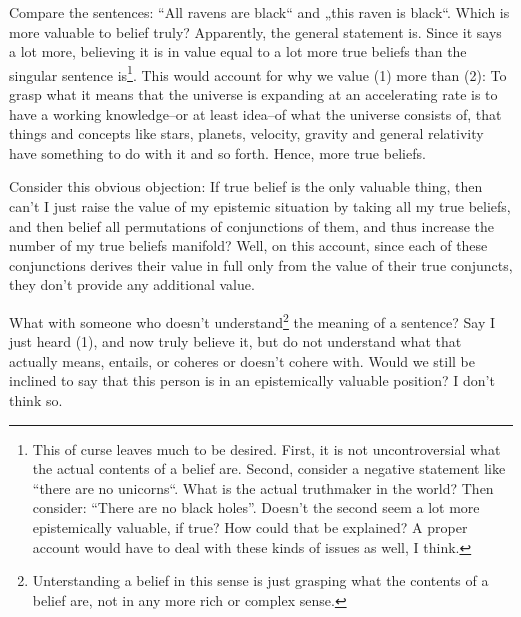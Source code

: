 \documentclass[12pt,numbers=noenddot]{scrartcl}
\begin{document}
Compare the sentences: “All ravens are black“ and „this raven is black“. Which is more valuable to belief truly? Apparently, the general statement is. Since it says a lot more, believing it is in value equal to a lot more true beliefs than the singular sentence is\footnote{\label{foot:noblackholes}This of curse leaves much to be desired. First, it is not uncontroversial what the actual contents of a belief are. Second, consider a negative statement like “there are no unicorns“. What is the actual truthmaker in the world? Then consider: “There are no black holes”. Doesn't the second seem a lot more epistemically valuable, if true? How could that be explained? A proper account would have to deal with these kinds of issues as well, I think.}.
This would account for why we value (1) more than (2): To grasp what it means that the universe is expanding at an accelerating rate is to have a working knowledge–or at least idea–of what the universe consists of, that things and concepts like stars, planets, velocity, gravity and general relativity have something to do with it and so forth. Hence, more true beliefs.

Consider this obvious objection: If true belief is the only valuable thing, then can't I just raise the value of my epistemic situation by taking all my true beliefs, and then belief all permutations of conjunctions of them, and thus increase the number of my true beliefs manifold? Well, on this account, since each of these conjunctions derives their value in full only from the value of their true conjuncts, they don't provide any additional value.

What with someone who doesn't understand\footnote{Unterstanding a belief in this sense is just grasping what the contents of a belief are, not in any more rich or complex sense.} the meaning of a sentence? Say I just heard (1), and now truly believe it, but do not understand what that actually means, entails, or coheres or doesn't cohere with. Would we still be inclined to say that this person is in an epistemically valuable position? I don't think so. 
\end{document}
